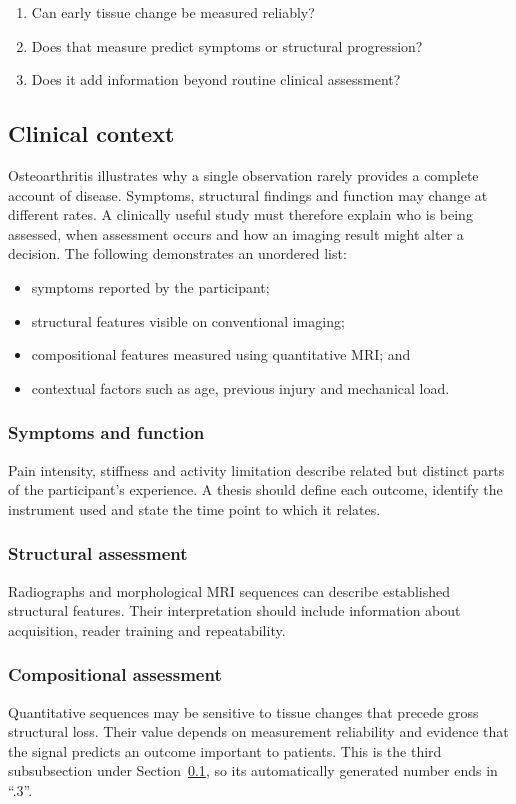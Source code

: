 \begin{enumerate}
  \item Can early tissue change be measured reliably?
  \item Does that measure predict symptoms or structural progression?
  \item Does it add information beyond routine clinical assessment?
\end{enumerate}

\subsection{Clinical context}
\label{sec:clinical-context}
Osteoarthritis illustrates why a single observation rarely provides a complete
account of disease. Symptoms, structural findings and function may change at
different rates. A clinically useful study must therefore explain who is being
assessed, when assessment occurs and how an imaging result might alter a
decision. The following demonstrates an unordered list:

\begin{itemize}
  \item symptoms reported by the participant;
  \item structural features visible on conventional imaging;
  \item compositional features measured using quantitative MRI; and
  \item contextual factors such as age, previous injury and mechanical load.
\end{itemize}

\subsubsection{Symptoms and function}
Pain intensity, stiffness and activity limitation describe related but distinct
parts of the participant's experience. A thesis should define each outcome,
identify the instrument used and state the time point to which it relates.

\subsubsection{Structural assessment}
Radiographs and morphological MRI sequences can describe established structural
features. Their interpretation should include information about acquisition,
reader training and repeatability.

\subsubsection{Compositional assessment}
Quantitative sequences may be sensitive to tissue changes that precede gross
structural loss. Their value depends on measurement reliability and evidence
that the signal predicts an outcome important to patients. This is the third
subsubsection under Section~\ref{sec:clinical-context}, so its automatically
generated number ends in ``.3''.

